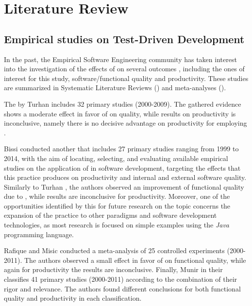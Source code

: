 \chapter{Literature Review}
\section{Empirical studies on Test-Driven Development}
In the past, the Empirical Software Engineering community has taken interest into the investigation of the effects of \tdd on several outcomes \cite{DBLP:conf/esem/FucciS0SSUTJO16} \cite{DBLP:journals/tse/ErdogmusMT05} \cite{DBLP:journals/infsof/Madeyski10}, including the ones of interest for this study, \ie software/functional quality and productivity. These studies are summarized in Systematic Literature Reviews (\slrs) and meta-analyses (\eg \cite{DBLP:journals/infsof/BissiNE16, DBLP:journals/infsof/MunirMP14, DBLP:journals/tse/RafiqueM13, TDDEffective}).

The \slr by Turhan \etal \cite{TDDEffective} includes 32 primary studies (2000-2009). The gathered evidence shows a moderate effect in favor of \tdd on quality, while results on productivity is inconclusive, namely there is no decisive advantage on productivity for employing \tdd. 

Bissi \etal \cite{DBLP:journals/infsof/BissiNE16} conducted another \slr that includes 27 primary studies ranging from 1999 to 2014, with the aim of locating, selecting, and evaluating available empirical studies on the application of \tdd in software development, targeting the effects that this practice produces on productivity and internal and external software quality. Similarly to Turhan \etal \cite{TDDEffective}, the authors observed an improvement of functional quality due to \tdd, while results are inconclusive for productivity. Moreover, one of the opportunities identified by this \slr for future research on the topic concerns the expansion of the \tdd practice to other paradigms and software development technologies, as most research is focused on simple examples using the \textit{Java} programming language.

Rafique and Misic \cite{DBLP:journals/tse/RafiqueM13} conducted a meta-analysis of 25 controlled experiments (2000-2011). The authors observed a small effect in favor of \tdd on functional quality, while again for productivity the results are inconclusive. 
Finally, Munir \etal \cite{DBLP:journals/infsof/MunirMP14,} in their \slr classifies 41 primary studies (2000-2011) according to the combination of their rigor and relevance. The authors found different conclusions for both functional quality and productivity in each classification.

